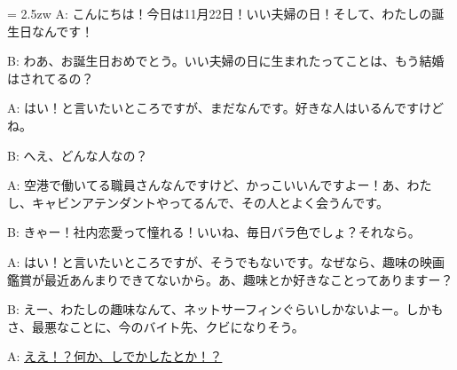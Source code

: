 \documentclass[11pt]{amsart}
\title{}
\author{}
\newenvironment{hangall}[1]{\hangindent = 2.5zw\everypar{\hangindent = 2.5zw}}{}
\begin{document}
\maketitle
\begin{hangall}{}%
A: こんにちは！今日は11月22日！いい夫婦の日！そして、わたしの誕生日なんです！

B: わあ、お誕生日おめでとう。いい夫婦の日に生まれたってことは、もう結婚はされてるの？

A: はい！と言いたいところですが、まだなんです。好きな人はいるんですけどね。

B: へえ、どんな人なの？

A: 空港で働いてる職員さんなんですけど、かっこいいんですよー！あ、わたし、キャビンアテンダントやってるんで、その人とよく会うんです。

B: きゃー！社内恋愛って憧れる！いいね、毎日バラ色でしょ？それなら。

A: はい！と言いたいところですが、そうでもないです。なぜなら、趣味の映画鑑賞が最近あんまりできてないから。あ、趣味とか好きなことってありますー？

B: えー、わたしの趣味なんて、ネットサーフィンぐらいしかないよー。しかもさ、最悪なことに、今のバイト先、クビになりそう。

A: \ul{ええ！？何か、しでかしたとか！？}\end{hangall}
\end{document}
